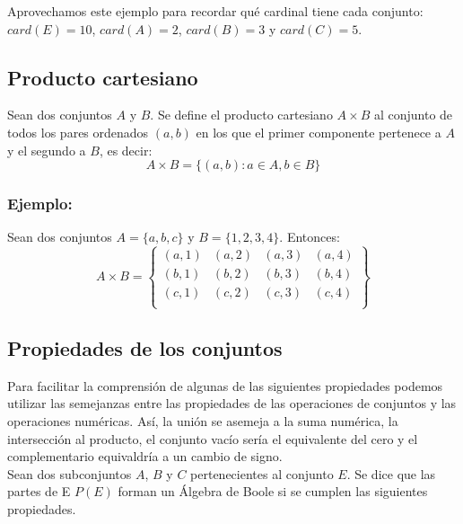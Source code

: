 Aprovechamos este ejemplo para recordar qué cardinal tiene cada conjunto: $card(E)=10$,  $card(A)=2$, $card(B)=3$ y $card(C)=5$.

\subsection*{Producto cartesiano}
Sean dos conjuntos $A$ y $B$. Se define el producto cartesiano $A\times B$ al conjunto de todos los pares ordenados $(a,b)$ en los que el primer componente pertenece a $A$ y el segundo a $B$, es decir:
$$
A\times B=\lbrace (a,b): a\in A, b\in B \rbrace
$$

\subsubsection*{Ejemplo:}
Sean dos conjuntos $A=\lbrace a,b,c \rbrace$ y $B=\lbrace 1,2,3,4 \rbrace$. Entonces:
$$
A\times B =
\left\lbrace
\begin{matrix}
(a,1) & (a,2) & (a,3) & (a,4)\\
(b,1) & (b,2) & (b,3) & (b,4)\\
(c,1) & (c,2) & (c,3) & (c,4)\\
\end{matrix}
\right\rbrace
$$

\subsection*{Propiedades de los conjuntos}
Para facilitar la comprensión de algunas de las siguientes propiedades podemos utilizar las semejanzas entre las propiedades de las operaciones de conjuntos y las operaciones numéricas. Así, la unión se asemeja a la suma numérica, la intersección al producto, el conjunto vacío sería el equivalente del cero y el complementario equivaldría a un cambio de signo.\\

Sean dos subconjuntos $A$, $B$ y $C$ pertenecientes al conjunto $E$. Se dice que las partes de E $P(E)$ forman un Álgebra de Boole si se cumplen las siguientes propiedades.\\

